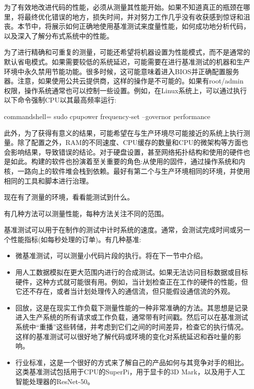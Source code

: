 

为了有效地改进代码的性能，必须从测量其性能开始。如果不知道真正的瓶颈在哪里，将最终优化错误的地方，损失时间，并对努力工作几乎没有收获感到惊讶和沮丧。本节中，将展示如何正确地使用基准测试来度量性能，如何成功地分析代码，以及深入了解分布式系统中的性能。


为了进行精确和可重复的测量，可能还希望将机器设置为性能模式，而不是通常的默认省电模式。如果需要较低的系统延迟，可能需要在进行基准测试的机器和生产环境中永久禁用节能功能。很多时候，这可能意味着进入BIOS并正确配置服务器。注意，如果使用公共云提供商，这样的操作是不可能的。如果有root/admin权限，操作系统通常也可以控制一些设置。例如，在Linux系统上，可以通过执行以下命令强制CPU以其最高频率运行:

\begin{tcblisting}{commandshell={}}
sudo cpupower frequency-set --governor performance
\end{tcblisting}

此外，为了获得有意义的结果，可能希望在与生产环境尽可能接近的系统上执行测量。除了配置之外，RAM的不同速度、CPU缓存的数量和CPU的微架构等方面也会影响结果，导致错误的结论。对于硬盘设置，甚至网络拓扑结构和使用的硬件也是如此。构建的软件也扮演着至关重要的角色:从使用的固件，通过操作系统和内核，一路向上的软件堆会栈到依赖。最好有第二个与生产环境相同的环境，并使用相同的工具和脚本进行治理。

现在有了测量的环境，看看能测试到什么。


有几种方法可以测量性能，每种方法关注不同的范围。

基准测试可以用于在制作的测试中计时系统的速度。通常，会测试完成时间或另一个性能指标(如每秒处理的订单)。有几种基准:

\begin{itemize}
\item 
微基准测试，可以测量小代码片段的执行。将在下一节中介绍。

\item 
用人工数据模拟在更大范围内进行的合成测试。如果无法访问目标数据或目标硬件，这种方式就可能很有用。例如，当计划检查正在工作的硬件的性能，但它还不存在，或者当计划处理传入的通信流，但只能假设通信流的外观。

\item 
回放，这是在现实工作负载下测量性能的一种非常准确的方法。其思想是记录进入生产系统的所有请求或工作负载，通常带有时间戳。然后可以在基准测试系统中“重播”这些转储，并考虑到它们之间的时间差异，检查它的执行情况。这样的基准测试可以很好地了解代码或环境的变化对系统延迟和吞吐量的影响。

\item 
行业标准，这是一个很好的方式来了解自己的产品如何与其竞争对手的相比。这类基准测试包括用于CPU的SuperPi，用于显卡的3D Mark，以及用于人工智能处理器的ResNet-50。
\end{itemize}

